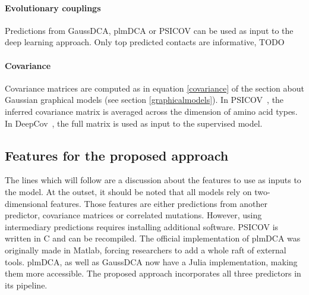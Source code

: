             \todo{}

        \paragraph{Evolutionary couplings}

            Predictions from GaussDCA, plmDCA or PSICOV can be used as input to the deep
            learning approach. Only top predicted contacts are informative, TODO

        \paragraph{Covariance}

            Covariance matrices are computed as in equation \ref{covariance} of the section
            about Gaussian graphical models (see section \ref{graphicalmodels}).
            In PSICOV~\cite{doi:10.1093/bioinformatics/btr638}, the inferred covariance
            matrix is averaged across the dimension of amino acid types.
            In DeepCov~\cite{doi:10.1093/bioinformatics/bty341}, the full matrix is used
            as input to the supervised model.

    \subsection{Features for the proposed approach}

        The lines which will follow are a discussion about the features to use as inputs
        to the model. At the outset, it should be noted that all models rely on
        two-dimensional features. Those features are either predictions from another
        predictor, covariance matrices or correlated mutations.
        However, using intermediary predictions requires installing additional software.
        PSICOV is written in C and can be recompiled. The official implementation of
        plmDCA was originally made in Matlab, forcing researchers to add a whole raft
        of external tools. plmDCA, as well as GaussDCA now have a Julia implementation,
        making them more accessible. The proposed approach incorporates all three
        predictors in its pipeline.

